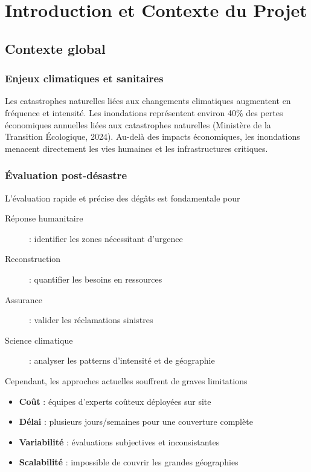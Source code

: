 \section{Introduction et Contexte du Projet}

\subsection{Contexte global}
\subsubsection{Enjeux climatiques et sanitaires}
Les catastrophes naturelles liées aux changements climatiques augmentent en fréquence et intensité. 
Les inondations représentent environ 40\% des pertes économiques annuelles liées aux catastrophes 
naturelles (Ministère de la Transition Écologique, 2024). Au-delà des impacts économiques, 
les inondations menacent directement les vies humaines et les infrastructures critiques.

\subsubsection{Évaluation post-désastre}
L'évaluation rapide et précise des dégâts est fondamentale pour\:

\begin{description}
    \item[Réponse humanitaire] : identifier les zones nécessitant d'urgence
    \item[Reconstruction] : quantifier les besoins en ressources
    \item[Assurance] : valider les réclamations sinistres
    \item[Science climatique] : analyser les patterns d'intensité et de géographie
\end{description}

Cependant, les approches actuelles souffrent de graves limitations\:

\begin{itemize}
    \item \textbf{Coût} : équipes d'experts coûteux déployées sur site
    \item \textbf{Délai} : plusieurs jours/semaines pour une couverture complète
    \item \textbf{Variabilité} : évaluations subjectives et inconsistantes
    \item \textbf{Scalabilité} : impossible de couvrir les grandes géographies
\end{itemize}

